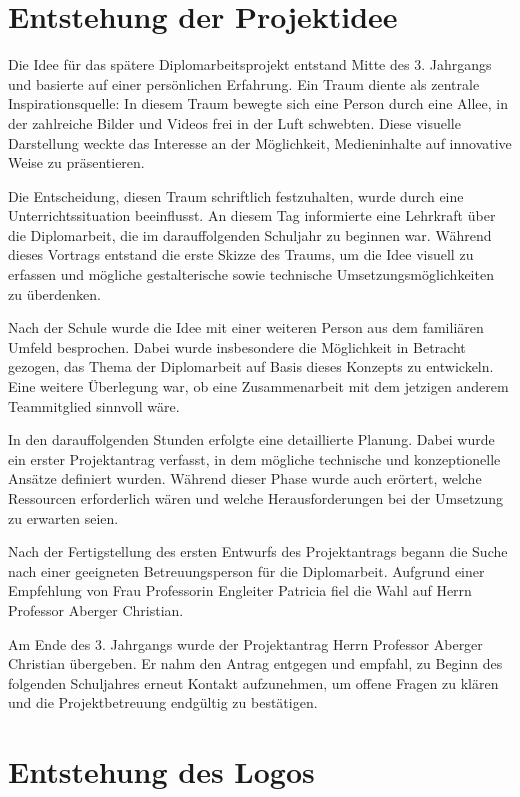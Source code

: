 
\section{Entstehung der Projektidee}


Die Idee für das spätere Diplomarbeitsprojekt entstand Mitte des 3. Jahrgangs 
und basierte auf einer persönlichen Erfahrung. Ein Traum diente als zentrale 
Inspirationsquelle: In diesem Traum bewegte sich eine Person durch eine Allee, 
in der zahlreiche Bilder und Videos frei in der Luft schwebten. Diese visuelle 
Darstellung weckte das Interesse an der Möglichkeit, Medieninhalte auf innovative 
Weise zu präsentieren.

Die Entscheidung, diesen Traum schriftlich festzuhalten, wurde durch eine 
Unterrichtssituation beeinflusst. An diesem Tag informierte eine Lehrkraft 
über die Diplomarbeit, die im darauffolgenden Schuljahr zu beginnen war. Während 
dieses Vortrags entstand die erste Skizze des Traums, um die Idee visuell zu erfassen 
und mögliche gestalterische sowie technische Umsetzungsmöglichkeiten zu überdenken.

Nach der Schule wurde die Idee mit einer weiteren Person aus dem familiären Umfeld 
besprochen. Dabei wurde insbesondere die Möglichkeit in Betracht gezogen, das Thema 
der Diplomarbeit auf Basis dieses Konzepts zu entwickeln. Eine weitere Überlegung war, 
ob eine Zusammenarbeit mit dem jetzigen anderem Teammitglied sinnvoll wäre.

In den darauffolgenden Stunden erfolgte eine detaillierte Planung. Dabei wurde ein 
erster Projektantrag verfasst, in dem mögliche technische und konzeptionelle Ansätze 
definiert wurden. Während dieser Phase wurde auch erörtert, welche Ressourcen 
erforderlich wären und welche Herausforderungen bei der Umsetzung zu erwarten 
seien.

Nach der Fertigstellung des ersten Entwurfs des Projektantrags begann die Suche nach 
einer geeigneten Betreuungsperson für die Diplomarbeit. Aufgrund einer Empfehlung von 
Frau Professorin Engleiter Patricia fiel die Wahl auf Herrn Professor Aberger 
Christian.

Am Ende des 3. Jahrgangs wurde der Projektantrag Herrn Professor Aberger Christian 
übergeben. Er nahm den Antrag entgegen und empfahl, zu Beginn des folgenden Schuljahres 
erneut Kontakt aufzunehmen, um offene Fragen zu klären und die Projektbetreuung 
endgültig zu bestätigen.


\section{Entstehung des Logos}


